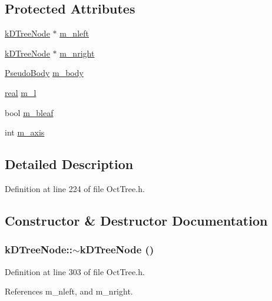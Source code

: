 \subsection*{Protected Attributes}
\begin{DoxyCompactItemize}
\item 
\hyperlink{classkDTreeNode}{kDTreeNode} $\ast$ \hyperlink{classkDTreeNode_ab0cafffecfa5a07a12a2857fd9f6a381}{m\_\-nleft}
\item 
\hyperlink{classkDTreeNode}{kDTreeNode} $\ast$ \hyperlink{classkDTreeNode_a57b5154c42c5fee9bddfa634ed9fc33c}{m\_\-nright}
\item 
\hyperlink{classPseudoBody}{PseudoBody} \hyperlink{classkDTreeNode_a61e1abf39597793e6fdb10504220f364}{m\_\-body}
\item 
\hyperlink{Global_8h_a031f8951175b43076c2084a6c2173410}{real} \hyperlink{classkDTreeNode_af16fa1bae226ae88071f476e1f61f93a}{m\_\-l}
\item 
bool \hyperlink{classkDTreeNode_a2ce766b2fc937514794f97c1eceb8f01}{m\_\-bleaf}
\item 
int \hyperlink{classkDTreeNode_af322d17aef0eabe2e151bf23f8aba132}{m\_\-axis}
\end{DoxyCompactItemize}


\subsection{Detailed Description}


Definition at line 224 of file OctTree.h.



\subsection{Constructor \& Destructor Documentation}
\subsubsection[{$\sim$kDTreeNode}]{\setlength{\rightskip}{0pt plus 5cm}kDTreeNode::$\sim$kDTreeNode ()}\label{classkDTreeNode_a706c34017d693b46a0c6d453ddd5fc81}


Definition at line 303 of file OctTree.h.



References m\_\-nleft, and m\_\-nright.

